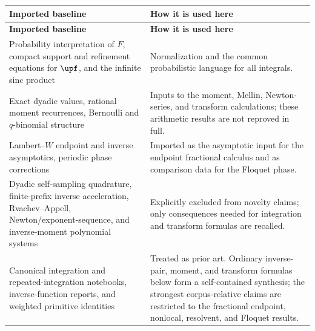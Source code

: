 \documentclass[11pt,oneside]{article}
\theoremstyle{definition}
\theoremstyle{remark}
\newcommand{\F}{F}
\newcommand{\1}{\mathbf 1}
\begin{document}
\begin{longtable}{@{}p{}p{}@{}}
\toprule
\textbf{Imported baseline} & \textbf{How it is used here}\\
\midrule
\endfirsthead
\toprule
\textbf{Imported baseline} & \textbf{How it is used here}\\
\midrule
\endhead
Probability interpretation of \(\F\), compact support and refinement equations for
\(\upf\), and the infinite sinc product & Normalization and the common probabilistic
language for all integrals.\\
Exact dyadic values, rational moment recurrences, Bernoulli and \(q\)-binomial structure &
Inputs to the moment, Mellin, Newton-series, and transform calculations; these arithmetic
results are not reproved in full.\\
Lambert--\(W\) endpoint and inverse asymptotics, periodic phase corrections & Imported as
the asymptotic input for the endpoint fractional calculus and as comparison data for the
Floquet phase.\\
Dyadic self-sampling quadrature, finite-prefix inverse acceleration, Rvachev--Appell,
Newton/exponent-sequence, and inverse-moment polynomial systems & Explicitly excluded from
novelty claims; only consequences needed for integration and transform formulas are
recalled.\\
Canonical integration and repeated-integration notebooks, inverse-function reports, and
weighted primitive identities & Treated as prior art.  Ordinary inverse-pair, moment, and
transform formulas below form a self-contained synthesis; the strongest corpus-relative
claims are restricted to the fractional endpoint, nonlocal, resolvent, and Floquet results.\\
\bottomrule
\end{longtable}
\end{document}
